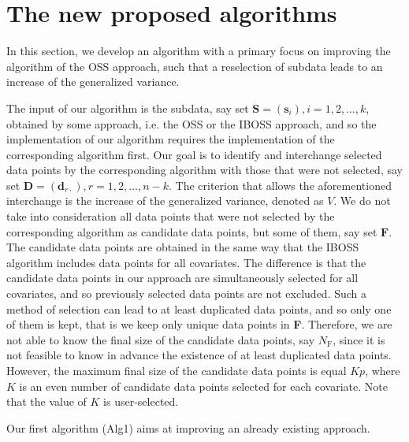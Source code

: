 \documentclass[12pt]{article}
\theoremstyle{definition}
\begin{document}
	\section{The new proposed algorithms}\label{section_algorithm}
	In this section, we develop an algorithm with a primary focus on improving the algorithm of the OSS approach, such that a reselection of subdata leads to an increase of the generalized variance. 
	
	The input of our algorithm is the subdata, say set $\textbf{S}=(\textbf{s}_{i}), i=1,2,\ldots,k$,  obtained by some approach, i.e. the OSS or the IBOSS approach, and so the implementation of our algorithm requires the implementation of the corresponding algorithm first. Our goal is to identify and interchange selected data points by the corresponding algorithm  with those that were not selected, say set $\textbf{D}=(\textbf{d}_{r\cdot}), r=1,2,\ldots,n-k$. The criterion that allows the aforementioned interchange is the increase of the generalized variance, denoted as $V$. We do not take into consideration all data points that were not selected by the corresponding algorithm as candidate data points, but some of them, say set $\textbf{F}$. The candidate data points are obtained in the same way that the IBOSS algorithm includes data points for all covariates. The difference is that the candidate data points in our approach are simultaneously selected for all covariates, and so previously selected data points are not excluded. Such a method of selection can lead to at least duplicated data points, and so only one of them is kept, that is we keep only unique data points in \textbf{F}. Therefore, we are not able to know the final size of the candidate data points, say $N_{\text{F}}$, since it is not feasible to know in advance the existence of at least duplicated data points. However, the maximum final size of the candidate data points is equal $Kp$, where $K$ is an even number of candidate data points selected for each covariate. Note that the value of $K$ is user-selected.
	
	Our first algorithm (Alg1) aims at improving an already existing approach.
	
\end{document}
